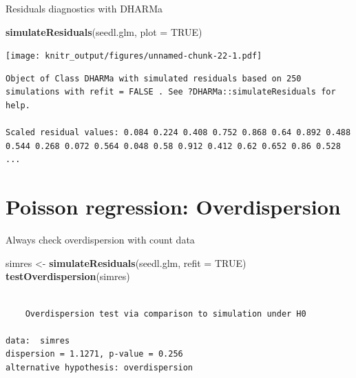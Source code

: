 \documentclass[10pt,ignorenonframetext,]{beamer}
\newenvironment{Shaded}{\begin{snugshade}}{\end{snugshade}}
\newcommand{\KeywordTok}[1]{\textcolor[rgb]{0.13,0.29,0.53}{\textbf{{#1}}}}
\newcommand{\DataTypeTok}[1]{\textcolor[rgb]{0.13,0.29,0.53}{{#1}}}
\newcommand{\StringTok}[1]{\textcolor[rgb]{0.31,0.60,0.02}{{#1}}}
\newcommand{\OtherTok}[1]{\textcolor[rgb]{0.56,0.35,0.01}{{#1}}}
\newcommand{\NormalTok}[1]{{#1}}
\begin{document}
\begin{frame}[fragile]{Residuals diagnostics with DHARMa}

\begin{Shaded}
\begin{Highlighting}[]
\KeywordTok{simulateResiduals}\NormalTok{(seedl.glm, }\DataTypeTok{plot =} \OtherTok{TRUE}\NormalTok{)}
\end{Highlighting}
\end{Shaded}

\texttt{[image: knitr\_output/figures/unnamed-chunk-22-1.pdf]}

\begin{verbatim}
Object of Class DHARMa with simulated residuals based on 250 simulations with refit = FALSE . See ?DHARMa::simulateResiduals for help. 
 
Scaled residual values: 0.084 0.224 0.408 0.752 0.868 0.64 0.892 0.488 0.544 0.268 0.072 0.564 0.048 0.58 0.912 0.412 0.62 0.652 0.86 0.528 ...
\end{verbatim}

\end{frame}

\section{Poisson regression:
Overdispersion}\label{poisson-regression-overdispersion}

\begin{frame}[fragile]{Always check overdispersion with count data}

\begin{Shaded}
\begin{Highlighting}[]
\NormalTok{simres <-}\StringTok{ }\KeywordTok{simulateResiduals}\NormalTok{(seedl.glm, }\DataTypeTok{refit =} \OtherTok{TRUE}\NormalTok{)}
\KeywordTok{testOverdispersion}\NormalTok{(simres)}
\end{Highlighting}
\end{Shaded}

\begin{verbatim}

    Overdispersion test via comparison to simulation under H0

data:  simres
dispersion = 1.1271, p-value = 0.256
alternative hypothesis: overdispersion
\end{verbatim}

\end{frame}
\end{document}
